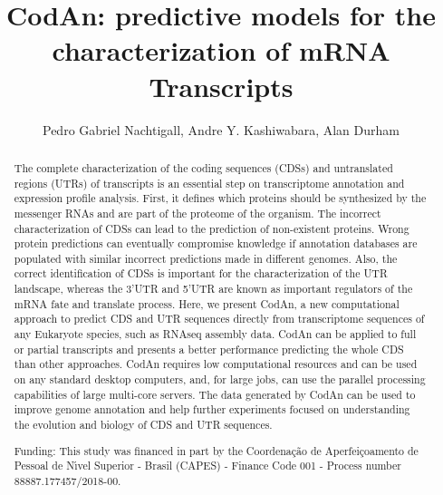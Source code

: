 \documentclass[twoside]{article}
\title{\vspace{-15mm}\fontsize{24pt}{10pt}\selectfont\textbf{ CodAn: predictive models for the characterization of mRNA Transcripts }} %
\author{ Pedro Gabriel Nachtigall, Andre Y. Kashiwabara, Alan Durham }
\affil{ Laborat\'orio Especial de Toxinologia Aplicada (LETA),  Instituto Butantan,  S\~ao Paulo,  Brazil }
\date{}
\begin{document}
  
  
  \maketitle %
  
  
  \thispagestyle{fancy} %
  
  
  \begin{abstract}
  The complete characterization of the coding sequences (CDSs) and untranslated regions (UTRs) of transcripts is an essential step on transcriptome annotation and expression profile analysis. First,  it defines which proteins should be synthesized by the messenger RNAs and are part of the proteome of the organism. The incorrect characterization of CDSs can lead to the prediction of non-existent proteins. Wrong protein predictions can eventually compromise knowledge if annotation databases are populated with similar incorrect predictions made in different genomes. Also,  the correct identification of CDSs is important for the characterization of the UTR landscape,  whereas the 3’UTR and 5’UTR are known as important regulators of the mRNA fate and translate process. Here,  we present CodAn,  a new computational approach to predict CDS and UTR sequences directly from transcriptome sequences of any Eukaryote species,  such as RNAseq assembly data. CodAn can be applied to full or partial transcripts and presents a better performance predicting the whole CDS than other approaches. CodAn requires low computational resources and can be used on any standard desktop computers,  and,  for large jobs,  can use the parallel processing capabilities of large multi-core servers. The data generated by CodAn can be used to improve genome annotation and help further experiments focused on understanding the evolution and biology of CDS and UTR sequences.
  
  Funding: This study was financed in part by the Coordena\c{c}\~ao de Aperfei\c{c}oamento de Pessoal de N\'{\i}vel Superior - Brasil (CAPES) - Finance Code 001 - Process number 88887.177457/2018-00. \\ 
  \end{abstract}
  
\end{document}
